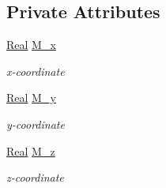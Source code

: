 \subsection*{Private Attributes}
\begin{DoxyCompactItemize}
\item 
\hyperlink{namespaceFVCode3D_a40c1f5588a248569d80aa5f867080e83}{Real} \hyperlink{classFVCode3D_1_1Point3D_a3eaeca319f23ac0967891d55446fa1d7}{M\+\_\+x}
\begin{DoxyCompactList}\small\item\em x-\/coordinate \end{DoxyCompactList}\item 
\hyperlink{namespaceFVCode3D_a40c1f5588a248569d80aa5f867080e83}{Real} \hyperlink{classFVCode3D_1_1Point3D_a087a884a5ed2eafb804db5f0a2f9aea6}{M\+\_\+y}
\begin{DoxyCompactList}\small\item\em y-\/coordinate \end{DoxyCompactList}\item 
\hyperlink{namespaceFVCode3D_a40c1f5588a248569d80aa5f867080e83}{Real} \hyperlink{classFVCode3D_1_1Point3D_ae335813a9743fd9406322e77e395823d}{M\+\_\+z}
\begin{DoxyCompactList}\small\item\em z-\/coordinate \end{DoxyCompactList}\end{DoxyCompactItemize}
